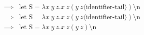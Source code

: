 \documentclass[12pt, a4paper, oneside]{memoir}
\begin{document}
\begin{align*}
    \implies{} & \text{let } \text{S} = \lambda x\ y\ z.x\ z (y\ z \langle \text{identifier-tail} \rangle) \text{\textbackslash n}                                                                             \\
    \implies{} & \text{let } \text{S} = \lambda x\ y\ z.x\ z (y\ z \langle \text{identifier-tail} \rangle) \text{\textbackslash n}                                                                             \\
    \implies{} & \text{let } \text{S} = \lambda x\ y\ z.x\ z (y\ z) \text{\textbackslash n}                                                                                                                    \\
\end{align*}
\end{document}
